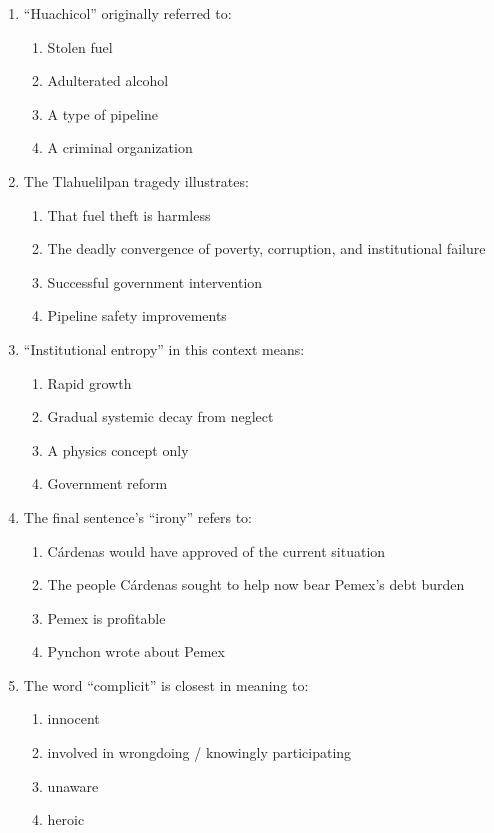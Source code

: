 \documentclass[10pt,a4paper]{article}
\begin{document}
\begin{enumerate}[label=\textbf{\arabic*.}, start=6]
\item ``Huachicol'' originally referred to:
\begin{enumerate}[label=(\Alph*)]
\item Stolen fuel \item Adulterated alcohol
\item A type of pipeline \item A criminal organization
\end{enumerate}

\item The Tlahuelilpan tragedy illustrates:
\begin{enumerate}[label=(\Alph*)]
\item That fuel theft is harmless
\item The deadly convergence of poverty, corruption, and institutional failure
\item Successful government intervention
\item Pipeline safety improvements
\end{enumerate}

\item ``Institutional entropy'' in this context means:
\begin{enumerate}[label=(\Alph*)]
\item Rapid growth \item Gradual systemic decay from neglect
\item A physics concept only \item Government reform
\end{enumerate}

\item The final sentence's ``irony'' refers to:
\begin{enumerate}[label=(\Alph*)]
\item C\'ardenas would have approved of the current situation
\item The people C\'ardenas sought to help now bear Pemex's debt burden
\item Pemex is profitable
\item Pynchon wrote about Pemex
\end{enumerate}

\item The word ``complicit'' is closest in meaning to:
\begin{enumerate}[label=(\Alph*)]
\item innocent \item involved in wrongdoing / knowingly participating
\item unaware \item heroic
\end{enumerate}
\end{enumerate}
\end{document}
